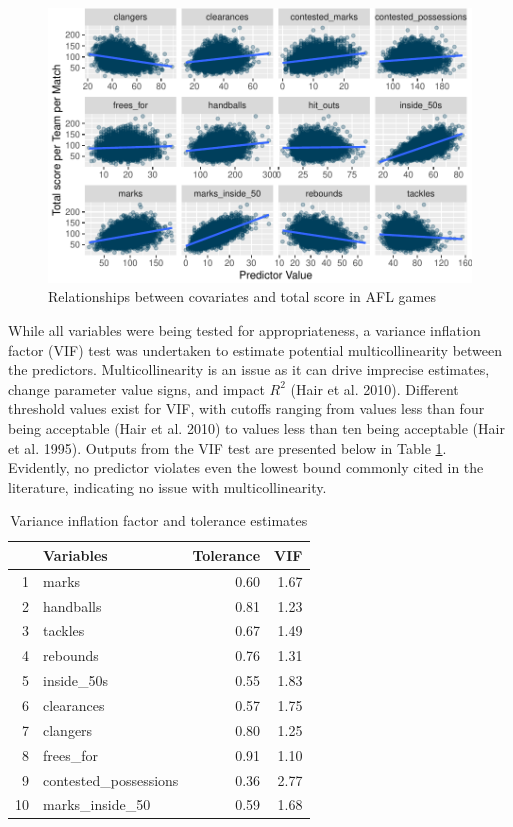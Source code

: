 \documentclass{article}
\begin{document}
\begin{figure}
\centering
\includegraphics{OLET5608_TrentHenderson_files/figure-latex/scatter-1.pdf}
\caption{\label{fig:scatter}Relationships between covariates and total score in AFL games}
\end{figure}

While all variables were being tested for appropriateness, a variance inflation factor (VIF) test was undertaken to estimate potential multicollinearity between the predictors. Multicollinearity is an issue as it can drive imprecise estimates, change parameter value signs, and impact \(R^2\) (Hair et al. 2010). Different threshold values exist for VIF, with cutoffs ranging from values less than four being acceptable (Hair et al. 2010) to values less than ten being acceptable (Hair et al. 1995). Outputs from the VIF test are presented below in Table \ref{tab:vif}. Evidently, no predictor violates even the lowest bound commonly cited in the literature, indicating no issue with multicollinearity.

\begin{table}[ht]
\centering
\begin{tabular}{rlrr}
  \hline
 & Variables & Tolerance & VIF \\ 
  \hline
1 & marks & 0.60 & 1.67 \\ 
  2 & handballs & 0.81 & 1.23 \\ 
  3 & tackles & 0.67 & 1.49 \\ 
  4 & rebounds & 0.76 & 1.31 \\ 
  5 & inside\_50s & 0.55 & 1.83 \\ 
  6 & clearances & 0.57 & 1.75 \\ 
  7 & clangers & 0.80 & 1.25 \\ 
  8 & frees\_for & 0.91 & 1.10 \\ 
  9 & contested\_possessions & 0.36 & 2.77 \\ 
  10 & marks\_inside\_50 & 0.59 & 1.68 \\ 
   \hline
\end{tabular}
\caption{Variance inflation factor and tolerance estimates} 
\label{tab:vif}
\end{table}
\end{document}
